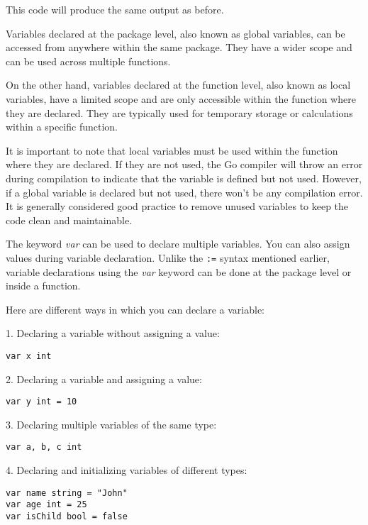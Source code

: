 This code will produce the same output as before.

Variables declared at the package level, also known as global variables, can be
accessed from anywhere within the same package. They have a wider scope and can
be used across multiple functions.

On the other hand, variables declared at the function level, also known as local
variables, have a limited scope and are only accessible within the function
where they are declared. They are typically used for temporary storage or
calculations within a specific function.

It is important to note that local variables must be used within the function
where they are declared. If they are not used, the Go compiler will throw an
error during compilation to indicate that the variable is defined but not used.
However, if a global variable is declared but not used, there won't be any
compilation error. It is generally considered good practice to remove unused
variables to keep the code clean and maintainable.

The keyword \textit{var} can be used to declare multiple variables. You can also
assign values during variable declaration. Unlike the \texttt{:=} syntax
mentioned earlier, variable declarations using the \textit{var} keyword can be
done at the package level or inside a function.

Here are different ways in which you can declare a variable:

1. Declaring a variable without assigning a value:

\begin{lstlisting}[numbers=none]
var x int
\end{lstlisting}

2. Declaring a variable and assigning a value:

\begin{lstlisting}[numbers=none]
var y int = 10
\end{lstlisting}

3. Declaring multiple variables of the same type:

\begin{lstlisting}[numbers=none]
var a, b, c int
\end{lstlisting}

4. Declaring and initializing variables of different types:

\begin{lstlisting}[numbers=none]
var name string = "John"
var age int = 25
var isChild bool = false
\end{lstlisting}

